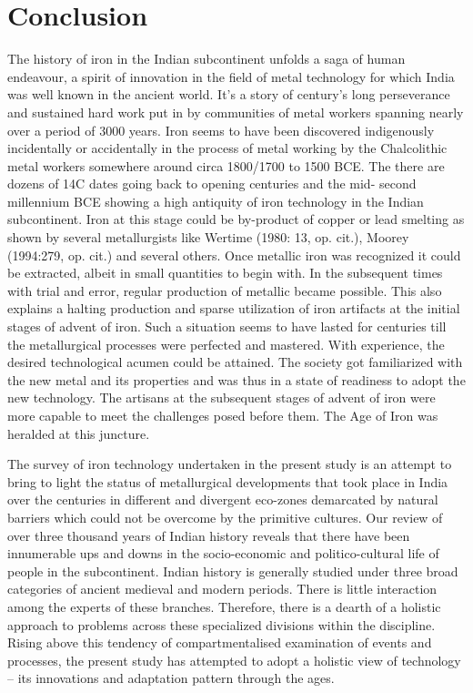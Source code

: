 \chapter{Conclusion}\label{chapter8}




The history of iron in the Indian subcontinent unfolds a saga of human endeavour, a spirit of innovation in the field of metal technology for which India was well known in the ancient world. It’s a story of century’s long perseverance and sustained hard work put in by communities of metal workers spanning nearly over a period of 3000 years. Iron seems to have been discovered indigenously incidentally or accidentally in the process of metal working by the Chalcolithic metal workers somewhere around circa 1800/1700 to 1500 BCE. The there are dozens of 14C dates going back to opening centuries and the mid- second millennium BCE showing a high antiquity of iron technology in the Indian subcontinent. Iron at this stage could be by-product of copper or lead smelting as shown by several metallurgists like Wertime (1980: 13, op. cit.), Moorey (1994:279, op. cit.) and several others. Once metallic iron was recognized it could be extracted, albeit in small quantities to begin with. In the subsequent times with trial and error, regular production of metallic became possible. This also explains a halting production and sparse utilization of iron artifacts at the initial stages of advent of iron. Such a situation seems to have lasted for centuries till the metallurgical processes were perfected and mastered. With experience, the desired technological acumen could be attained. The society got familiarized with the new metal and its properties and was thus in a state of readiness to adopt the new technology. The artisans at the subsequent stages of advent of iron were more capable to meet the challenges posed before them. The Age of Iron was heralded at this juncture.  

The survey of iron technology undertaken in the present study is an attempt to bring to light the status of metallurgical developments that took place in India over the centuries in different and divergent eco-zones demarcated by natural barriers which could not be overcome by the primitive cultures. Our review of over three thousand years of Indian history reveals that there have been innumerable ups and downs in the socio-economic and politico-cultural life of people in the subcontinent. Indian history is generally studied under three broad categories of ancient medieval and modern periods. There is little interaction among the experts of these branches. Therefore, there is a dearth of a holistic approach to problems across these specialized divisions within the discipline. Rising above this tendency of compartmentalised examination of events and processes, the present study has attempted to adopt a holistic view of technology – its innovations and adaptation pattern through the ages. 

